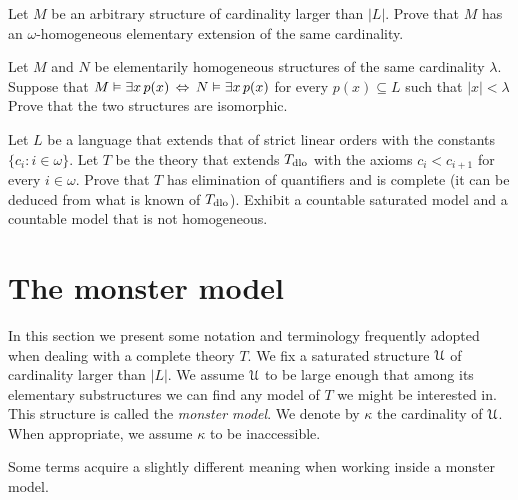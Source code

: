 \begin{exercise}\label{ex_omega_homogeneous_same_card}
Let $M$ be an arbitrary structure of cardinality larger than $|L|$.
Prove that $M$ has an $\omega\mbox{-}$homogeneous elementary extension of the same cardinality. 
\end{exercise}

\begin{exercise}
Let $M$ and $N$ be elementarily homogeneous structures of the same cardinality $\lambda$. 
Suppose that $M\vDash\exists x\, p(x)\,\Leftrightarrow\,N\vDash\exists x\, p(x)$ for every $p(x)\subseteq L$ such that $|x|<\lambda$
Prove that the two structures are isomorphic. 
\end{exercise}

\begin{exercise}\label{vaughtesempio}
Let $L$ be a language that extends that of strict linear orders with the constants $\{c_i: i\in\omega\}$.
Let $T$ be the theory that extends $T_{\rm dlo}$ with the axioms $c_i<c_{i+1}$ for every  $i\in\omega$. Prove that $T$ has elimination of quantifiers and is complete (it can be deduced from what is known of $T_{\rm dlo}$). 
Exhibit a countable saturated model and a countable model that is not homogeneous. 
\end{exercise}

\section{The monster model}\label{monster}
\label{compattezzasaturazione}

In this section we present some notation and terminology frequently adopted when dealing with a complete theory $T$.
We fix a saturated structure $\EuScript U$ of cardinality larger than $|L|$.
We assume $\EuScript U$ to be large enough that among its elementary substructures we can find any model of $T$ we might be interested in.
This structure is called the \emph{monster model}.
We denote by $\kappa$ the cardinality of $\EuScript U$.
When appropriate, we assume $\kappa$ to be inaccessible. 

Some terms acquire a slightly different meaning when working inside a monster model.


\newcommand{\labellalunga}[1]{#1\hfill}
\newenvironment{litemize}[1]
   {\begin{list}{}{
   \setlength{\parskip}{0mm}
   \setlength{\topsep}{5mm}
   \setlength{\partopsep}{0mm}
   \setlength{\rightmargin}{0mm}
   \setlength{\listparindent}{0mm}
   \setlength{\itemindent}{0mm}
   \setlength{\itemsep}{1mm}
   \settowidth{\labelwidth}{#1}
   \setlength{\parsep}{0mm}
   \setlength{\partopsep}{0mm}
   \setlength{\labelsep}{3mm}
   \setlength{\leftmargin}{\labelwidth+\labelsep}
   \let\makelabel\labellalunga}}{
   \end{list}}


